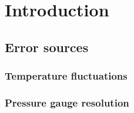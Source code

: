 \documentclass[11pt, rgb]{scrreprt}
\begin{document}
\listoftables
{}




%
%
%
%



\normalsize

\newpage


\chapter{Introduction}

    \section{Error sources}

        \subsection{Temperature fluctuations}


        \subsection{Pressure gauge resolution}
\end{document}

